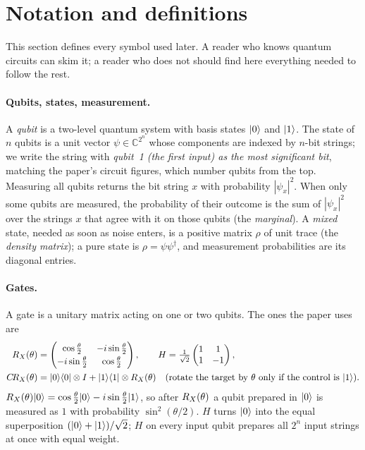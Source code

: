 \section{Notation and definitions}
\label{sec:notation}

This section defines every symbol used later.  A reader who knows quantum circuits can skim it;
a reader who does not should find here everything needed to follow the rest.

\paragraph{Qubits, states, measurement.}
A \emph{qubit} is a two-level quantum system with basis states $\lvert 0 \rangle$ and $\lvert 1 \rangle$.  The
state of $n$ qubits is a unit vector $\psi \in \mathbb{C}^{2^n}$ whose components are indexed by
$n$-bit strings; we write the string with \emph{qubit~1 (the first input) as the most significant
bit}, matching the paper's circuit figures, which number qubits from the top.  Measuring all
qubits returns the bit string $x$ with probability $|\psi_x|^2$.  When only some qubits are
measured, the probability of their outcome is the sum of $|\psi_x|^2$ over the strings $x$ that
agree with it on those qubits (the \emph{marginal}).  A \emph{mixed} state, needed as soon as
noise enters, is a positive matrix $\rho$ of unit trace (the \emph{density matrix}); a pure state
is $\rho=\psi\psi^\dagger$, and measurement probabilities are its diagonal entries.

\paragraph{Gates.}
A gate is a unitary matrix acting on one or two qubits.  The ones the paper uses are
\begin{align}
R_X(\theta) &= \begin{pmatrix}\cos\frac{\theta}{2} & -i\sin\frac{\theta}{2}\\[2pt]
-i\sin\frac{\theta}{2} & \cos\frac{\theta}{2}\end{pmatrix}, \qquad
H = \tfrac{1}{\sqrt2}\begin{pmatrix}1&1\\1&-1\end{pmatrix}, \\
C\!R_X(\theta) &= \lvert 0 \rangle\langle 0 \rvert\otimes I + \lvert 1 \rangle\langle 1 \rvert\otimes R_X(\theta)
\quad\text{(rotate the target by $\theta$ only if the control is $\lvert 1 \rangle$).}
\end{align}
$R_X(\theta)\lvert 0 \rangle = \cos\frac{\theta}{2}\lvert 0 \rangle - i\sin\frac{\theta}{2}\lvert 1 \rangle$, so after
$R_X(\theta)$ a qubit prepared in $\lvert 0 \rangle$ is measured as $1$ with probability
$\sin^2(\theta/2)$.  $H$ turns $\lvert 0 \rangle$ into the equal superposition
$(\lvert 0 \rangle+\lvert 1 \rangle)/\sqrt2$; $H$ on every input qubit prepares all $2^n$ input strings at once with
equal weight.

